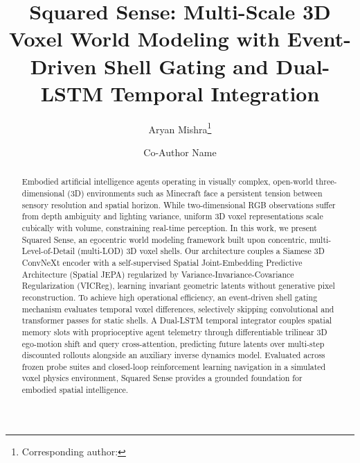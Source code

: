 \documentclass{svproc}
\begin{document}
\mainmatter

\title{Squared Sense: Multi-Scale 3D Voxel World Modeling with Event-Driven Shell Gating and Dual-LSTM Temporal Integration}


\author{Aryan Mishra\thanks{Corresponding author: } \and Co-Author Name}



\maketitle

\begin{abstract}
Embodied artificial intelligence agents operating in visually complex, open-world three-dimensional (3D) environments such as Minecraft face a persistent tension between sensory resolution and spatial horizon. While two-dimensional RGB observations suffer from depth ambiguity and lighting variance, uniform 3D voxel representations scale cubically with volume, constraining real-time perception. In this work, we present Squared Sense, an egocentric world modeling framework built upon concentric, multi-Level-of-Detail (multi-LOD) 3D voxel shells. Our architecture couples a Siamese 3D ConvNeXt encoder with a self-supervised Spatial Joint-Embedding Predictive Architecture (Spatial JEPA) regularized by Variance-Invariance-Covariance Regularization (VICReg), learning invariant geometric latents without generative pixel reconstruction. To achieve high operational efficiency, an event-driven shell gating mechanism evaluates temporal voxel differences, selectively skipping convolutional and transformer passes for static shells. A Dual-LSTM temporal integrator couples spatial memory slots with proprioceptive agent telemetry through differentiable trilinear 3D ego-motion shift and query cross-attention, predicting future latents over multi-step discounted rollouts alongside an auxiliary inverse dynamics model. Evaluated across frozen probe suites and closed-loop reinforcement learning navigation in a simulated voxel physics environment, Squared Sense provides a grounded foundation for embodied spatial intelligence.
\end{abstract}
\end{document}
